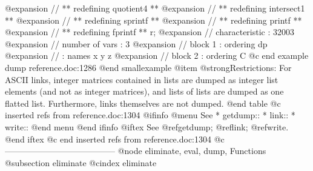 @expansion{} // ** redefining quotient4 **
@expansion{} // ** redefining intersect1 **
@expansion{} // ** redefining sprintf **
@expansion{} // ** redefining printf **
@expansion{} // ** redefining fprintf **
  r;
@expansion{} //   characteristic : 32003
@expansion{} //   number of vars : 3
@expansion{} //        block   1 : ordering dp
@expansion{} //                  : names    x y z 
@expansion{} //        block   2 : ordering C
@c end example dump reference.doc:1286
@end smallexample
@item @strong{Restrictions:}
For ASCII links, integer matrices contained in lists are  dumped as
integer list elements (and not as integer matrices), and lists of lists
are dumped as one flatted list. Furthermore, links
themselves are not dumped.
@end table
@c inserted refs from reference.doc:1304
@ifinfo
@menu
See
* getdump::
* link::
* write::
@end menu
@end ifinfo
@iftex
See
@ref{getdump};
@ref{link};
@ref{write}.
@end iftex
@c end inserted refs from reference.doc:1304
@c ---------------------------------------
@node eliminate, eval, dump, Functions
@subsection eliminate
@cindex eliminate

